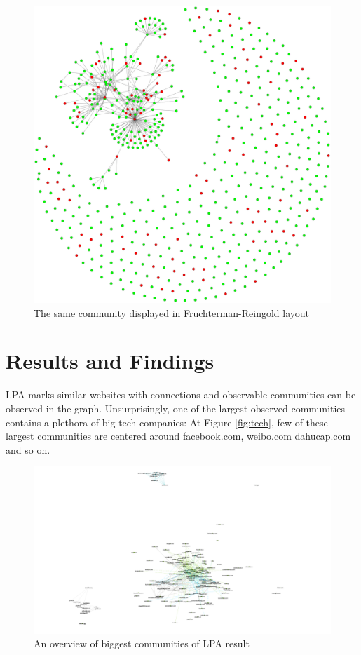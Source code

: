 \documentclass[conference]{IEEEtran}
\begin{document}
\begin{figure}[htbp]
 \centerline{\includegraphics[width=\columnwidth]{community_fr.png}}
 \caption{The same community displayed in Fruchterman-Reingold layout}
 \label{fig:communityFRLayout}
\end{figure}

\section{Results and Findings}

LPA marks similar websites with connections and observable communities can be observed in the graph. Unsurprisingly, one of the largest observed communities contains a plethora of big tech companies: At Figure \ref{fig:tech}, few of these largest communities are centered around facebook.com, weibo.com dahucap.com and so on.

\begin{figure}[htbp]
 \centerline{\includegraphics[width=\columnwidth]{figs/Huge.png}}
 \caption{An overview of biggest communities of LPA result}
 \label{fig:biggestCommunities}
\end{figure}
\end{document}
